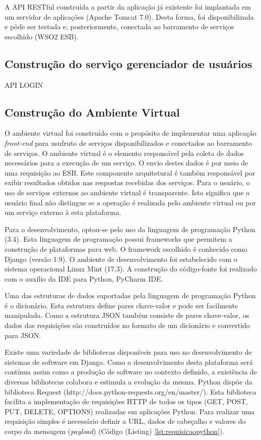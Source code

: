 A API RESTful construída a partir da aplicação já existente foi implantada em um servidor de aplicações (Apache Tomcat 7.0). Desta forma, foi disponibilizada e pôde ser testada e, posteriormente, conectada ao barramento de serviços escolhido (WSO2 ESB).

\subsection{Construção do serviço gerenciador de usuários}
API LOGIN

\subsection{Construção do Ambiente Virtual}
O ambiente virtual foi construído com o propósito de implementar uma aplicação \textit{front-end} para usufruto de serviços disponibilizados e conectados ao barramento de serviços. O ambiente virtual é o elemento responsável pela coleta de dados necessários para a execução de um serviço. O envio destes dados é por meio de uma requisição ao ESB. Este componente arquitetural é também responsável por exibir resultados obtidos nas respostas recebidas dos serviços. Para o usuário, o uso de serviços externos ao ambiente virtual é transparente. Isto significa que o usuário final não distingue se a operação é realizada pelo ambiente virtual ou por um serviço externo à esta plataforma.

Para o desenvolvimento, optou-se pelo uso da linguagem de programação Python (3.4). Esta linguagem de programação possui frameworks que permitem a construção de plataformas para web. O framework escolhido é conhecido como Django (versão 1.9). O ambiente de desenvolvimento foi estabelecido com o sistema operacional Linux Mint (17.3). A construção do código-fonte foi realizado com o auxílio da IDE para Python, PyCharm IDE.

Uma das estruturas de dados suportadas pela linguagem de programação Python é o dicionário. Esta estrutura define pares chave-valor e pode ser facilmente manipulada. Como a estrutura JSON também consiste de pares chave-valor, os dados das requisições são construídos no formato de um dicionário e convertido para JSON.

Existe uma variedade de bibliotecas disponíveis para uso no desenvolvimento de sistemas de software em Django. Como o desenvolvimento desta plataforma será contínua assim como a produção de software no contexto definido, a existência de diversas bibliotecas colabora e estimula a evolução da mesma. Python dispõe da biblioteca Request (http://docs.python-requests.org/en/master/). Esta biblioteca facilita a implementação de requisições HTTP de todos os tipos (GET, POST, PUT, DELETE, OPTIONS) realizadas em aplicações Python. Para realizar uma requisição simples é necessário definir a URL, dados de cabeçalho e valores do corpo da mensagem (\textit{payload}) (Código (Listing) \ref{lst:requisicaopython}).

